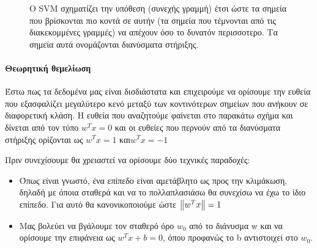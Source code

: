 \begin{figure}
	\centering
	\caption[Λειτουργία \gls{SVM}]{Ο SVM σχηματίζει την υπόθεση (συνεχής γραμμή) έτσι ώστε τα σημεία που βρίσκονται πιο κοντά σε αυτήν (τα σημεία που τέμνονται από τις διακεκομμένες γραμμές) να απέχουν όσο το δυνατόν περισσοτερο. Τα σημεία αυτά ονομάζονται διανύσματα στήριξης.}	
\end{figure}

\paragraph{Θεωρητική θεμελίωση} Έστω πως τα δεδομένα μας είναι δισδιάστατα και επιχειρούμε να ορίσουμε την ευθεία που εξασφαλίζει μεγαλύτερο κενό μεταξύ των κοντινότερων σημείων που ανήκουν σε διαφορετική κλάση. Η ευθεία που αναζητούμε φαίνεται στο παρακάτω σχήμα και δίνεται από τον τύπο $w^T x = 0$ και οι ευθείες που περνούν από τα διανύσματα στήριξης ορίζονται ως $w^T x = 1$ και$ w^T x =-1$

Πριν συνεχίσουμε θα χρειαστεί να ορίσουμε δύο τεχνικές παραδοχές:
\begin{itemize}
	\item Όπως είναι γνωστό, ένα επίπεδο είναι αμετάβλητο ως προς την κλιμάκωση, δηλαδή με όποια σταθερά και να το πολλαπλασιάσω θα συνεχίσω να έχω το ίδιο επίπεδο. Για αυτό θα κανονικοποιούμε ώστε $\left\lVert w^T x\right\rVert=1$
	\item  Μας βολεύει να βγάλουμε τον σταθερό όρο $w_0$ από το διάνυσμα w και να ορίσουμε την επιφάνεια ως $w^T  x + b = 0$, όπου προφανώς το b αντιστοιχεί στο $w_0$.	
\end{itemize}

